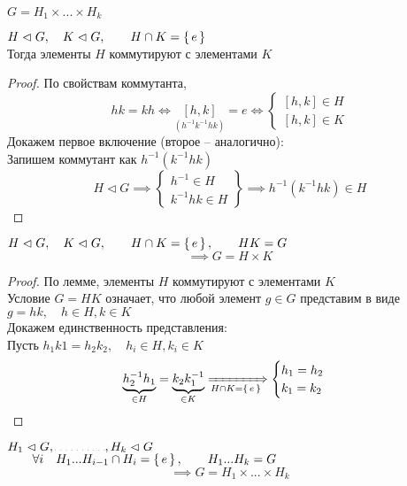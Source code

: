 \begin{notation}
	$ G = H_1 \times ... \times H_k $
\end{notation}

\begin{lemma}
	$ H \vartriangleleft G, \quad K \vartriangleleft G, \qquad H \cap K = \set{e} $ \\
	Тогда элементы $ H $ коммутируют с элементами $ K $
\end{lemma}

\begin{proof}
	По свойствам коммутанта,
	$$ hk = kh \iff \underset{(h^{-1}k^{-1}hk)}{[h, k]} = e \iff
	\begin{cases}
		[h, k] \in H \\
		[h, k] \in K
	\end{cases} $$
	Докажем первое включение (второе -- аналогично): \\
	Запишем коммутант как $ h^{-1}(k^{-1}hk) $
	$$ H \vartriangleleft G \implies
	\begin{Bmatrix}
		h^{-1} \in H \\
		k^{-1}hk \in H
	\end{Bmatrix} \implies h^{-1}(k^{-1}hk) \in H $$
\end{proof}

\begin{theorem}
	$ H \vartriangleleft G, \quad K \vartriangleleft G, \qquad H \cap K = \set{e}, \qquad HK = G $
	$$ \implies G = H \times K $$
\end{theorem}

\begin{proof}
	По лемме, элементы $ H $ коммутируют с элементами $ K $ \\
	Условие $ G = HK $ означает, что любой элемент $ g \in G $ представим в виде $ g = hk, \quad h \in H, k \in K $ \\
	Докажем единственность представления: \\
	Пусть $ h_1k1 = h_2k_2, \quad h_i \in H, k_i \in K $
	$$ \underbrace{h_2^{-1}h_1}_{\in H} = \underbrace{k_2k_1^{-1}}_{\in K} \xRightarrow[H \cap K = \set{e}]{}
	\begin{cases}
		h_1 = h_2 \\
		k_1 = k_2
	\end{cases} $$
\end{proof}

\begin{theorem}
	$ H_1 \vartriangleleft G, \widedots[4em], H_k \vartriangleleft G $ \\
	$ \qquad \forall i \quad H_1...H_{i - 1} \cap H_i = \set{e}, \qquad H_1...H_k = G $
	$$ \implies G = H_1 \times ... \times H_k $$
\end{theorem}

